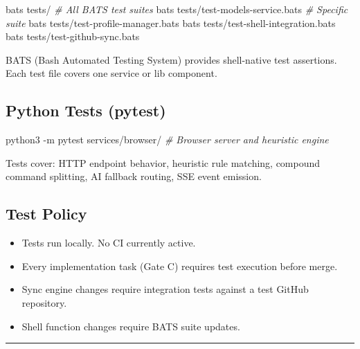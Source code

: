\documentclass[
]{article}
\newenvironment{Shaded}{\begin{snugshade}}{\end{snugshade}}
\newcommand{\AttributeTok}[1]{\textcolor[rgb]{0.13,0.29,0.53}{#1}}
\newcommand{\CommentTok}[1]{\textcolor[rgb]{0.56,0.35,0.01}{\textit{#1}}}
\newcommand{\ExtensionTok}[1]{#1}
\newcommand{\NormalTok}[1]{#1}
\providecommand{\tightlist}{%
  \setlength{\itemsep}{0pt}\setlength{\parskip}{0pt}}
\begin{document}
\begin{Shaded}
\begin{Highlighting}[]
\ExtensionTok{bats}\NormalTok{ tests/                          }\CommentTok{\# All BATS test suites}
\ExtensionTok{bats}\NormalTok{ tests/test{-}models{-}service.bats  }\CommentTok{\# Specific suite}
\ExtensionTok{bats}\NormalTok{ tests/test{-}profile{-}manager.bats}
\ExtensionTok{bats}\NormalTok{ tests/test{-}shell{-}integration.bats}
\ExtensionTok{bats}\NormalTok{ tests/test{-}github{-}sync.bats}
\end{Highlighting}
\end{Shaded}

BATS (Bash Automated Testing System) provides shell-native test
assertions. Each test file covers one service or lib component.

\subsection{Python Tests (pytest)}\label{python-tests-pytest}

\begin{Shaded}
\begin{Highlighting}[]
\ExtensionTok{python3} \AttributeTok{{-}m}\NormalTok{ pytest services/browser/  }\CommentTok{\# Browser server and heuristic engine}
\end{Highlighting}
\end{Shaded}

Tests cover: HTTP endpoint behavior, heuristic rule matching, compound
command splitting, AI fallback routing, SSE event emission.

\subsection{Test Policy}\label{test-policy}

\begin{itemize}
\tightlist
\item
  Tests run locally. No CI currently active.
\item
  Every implementation task (Gate C) requires test execution before
  merge.
\item
  Sync engine changes require integration tests against a test GitHub
  repository.
\item
  Shell function changes require BATS suite updates.
\end{itemize}

\begin{center}\rule{0.5\linewidth}{0.5pt}\end{center}
\end{document}
